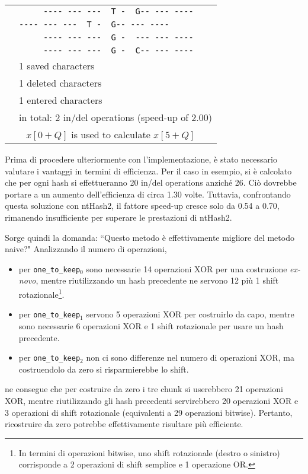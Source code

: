 \begin{example}
	\begin{center}
		\begin{tabular}{c | l}
			\multirow{8}{*}{\rotatebox[origin=c]{90}{$\texttt{one\_to\_keep}_2$}}
			& \verb|     ---- --- ---  T -  G-- --- ----| \\
			& \verb|---- --- ---  T -  G-- --- ----     | \\
			& \verb|     ---- --- ---  G -  --- --- ----| \\
			& \verb|     ---- --- ---  G -  C-- --- ----| \\
			\cline{2-2}
			& 1 saved characters \\
			& 1 deleted characters \\
			& 1 entered characters \\
			\cline{2-2}
			& in total: 2 in/del operations (speed-up of 2.00) \\
			\bottomrule
			\multicolumn{2}{c}{$x[0 + Q]$ is used to calculate $x[5 + Q]$} \\
		\end{tabular}
	\end{center}
\end{example}

Prima di procedere ulteriormente con l'implementazione, è stato necessario valutare i vantaggi in termini di efficienza. Per il caso in esempio, si è calcolato che per ogni hash si effettueranno 20 in/del operations anziché 26. Ciò dovrebbe portare a un aumento dell'efficienza di circa 1.30 volte. Tuttavia, confrontando questa soluzione con ntHash2, il fattore speed-up cresce solo da 0.54 a 0.70, rimanendo insufficiente per superare le prestazioni di ntHash2.

Sorge quindi la domanda: “Questo metodo è effettivamente migliore del metodo naive?" Analizzando il numero di operazioni,
\begin{itemize}
	\item per \verb|one_to_keep|$_0$ sono necessarie 14 operazioni XOR per una costruzione \emph{ex-novo}, mentre riutilizzando un hash precedente ne servono 12 più 1 shift rotazionale\footnote{In termini di operazioni bitwise, uno shift rotazionale (destro o sinistro) corrisponde a 2 operazioni di shift semplice e 1 operazione OR.}.
	\item per \verb|one_to_keep|$_1$ servono 5 operazioni XOR per costruirlo da capo, mentre sono necessarie 6 operazioni XOR e 1 shift rotazionale per usare un hash precedente.
	\item per \verb|one_to_keep|$_2$ non ci sono differenze nel numero di operazioni XOR, ma costruendolo da zero si risparmierebbe lo shift.
\end{itemize}
ne consegue che per costruire da zero i tre chunk si userebbero 21 operazioni XOR, mentre riutilizzando gli hash precedenti servirebbero 20 operazioni XOR e 3 operazioni di shift rotazionale (equivalenti a 29 operazioni bitwise). Pertanto, ricostruire da zero potrebbe effettivamente risultare più efficiente.



